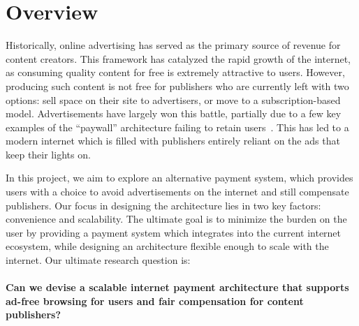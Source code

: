 
\section{Overview}
Historically, online advertising has served as the primary source of
revenue for content creators. This framework has catalyzed the rapid
growth of the internet, as consuming quality content for free is
extremely attractive to users. However, producing such content is not
free for publishers who are currently left with two options: sell
space on their site to advertisers, or move to a subscription-based
model. Advertisements have largely won this battle, partially due to a
few key examples of the “paywall” architecture failing to retain
users~\cite{nyt}. This has led to a modern internet which is filled
with publishers entirely reliant on the ads that keep their lights on.

In this project, we aim to explore an alternative payment system,
which provides users with a choice to avoid advertisements on the
internet and still compensate publishers. Our focus in designing the
architecture lies in two key factors: convenience and scalability. The
ultimate goal is to minimize the burden on the user by providing a
payment system which integrates into the current internet ecosystem,
while designing an architecture flexible enough to scale with the
internet. Our ultimate research question is: \\
\\
\textbf{Can we devise a scalable internet payment architecture that
  supports ad-free browsing for users and fair compensation for
  content publishers?}

